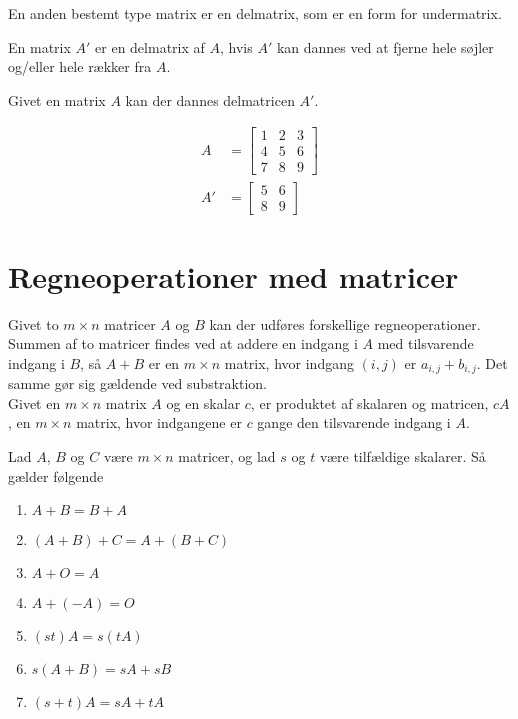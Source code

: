 En anden bestemt type matrix er en delmatrix, som er en form for undermatrix. 
\begin{defn} [Delmatrix]
En matrix $A'$ er en delmatrix af $A$, hvis $A'$ kan dannes ved at fjerne hele søjler og/eller hele rækker fra $A$.
\label{delmatrix}
\end{defn}

Givet en matrix $A$ kan der dannes delmatricen $A'$.

\begin{align*}
A &= \begin{bmatrix}
	1 & 2 & 3 \\
	4 & 5 & 6 \\
	7 & 8 & 9 
\end{bmatrix}\\
A' &= \begin{bmatrix}
	5 & 6 \\
	8 & 9
\end{bmatrix}
\end{align*}

\section{Regneoperationer med matricer}
Givet to $m \times n$ matricer $A$ og $B$ kan der udføres forskellige regneoperationer. 
Summen af to matricer findes ved at addere en indgang i $A$ med tilsvarende indgang i $B$, så $A+B$ er en $m \times n$ matrix, hvor indgang $(i,j)$ er $a_{i,j}+b_{i,j}$. 
Det samme gør sig gældende ved substraktion. \\
Givet en $m \times n$ matrix $A$ og en skalar $c$, er produktet af skalaren og matricen, $cA$, en $m \times n$ matrix, hvor indgangene er $c$ gange den tilsvarende indgang i $A$. \\

\begin{stn}
Lad $A$, $B$ og $C$ være $m \times n$ matricer, og lad $s$ og $t$ være tilfældige skalarer. 
Så gælder følgende
\begin{enumerate}[label=(\alph*)]
\item $A + B = B + A$
\item $(A + B) + C = A + (B + C)$
\item $A + O = A$
\item $A + (-A) = O$
\item $(st) A = s (tA)$
\item $s(A + B) = sA + sB$
\item $(s+t)A = sA + tA$
\end{enumerate}
\label{stn_regn}
\end{stn}

